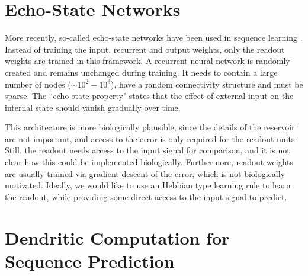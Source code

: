 \documentclass[10pt,a4paper]{article}
\begin{document}
\section{Echo-State Networks}

More recently, so-called echo-state networks have been used in sequence learning \cite{Jaeger_2010}. Instead of training the input, recurrent and output weights, only the readout weights are trained in this framework. A recurrent neural network is randomly created and remains unchanged during training. It needs to contain a large number of nodes ($\sim 10^2 - 10^3$), have a random connectivity structure and must be sparse. The ``echo state property" states that the effect of external input on the internal state should vanish gradually over time.

This architecture is more biologically plausible, since the details of the reservoir are not important, and access to the error is only required for the readout units. Still, the readout needs access to the input signal for comparison, and it is not clear how this could be implemented biologically. Furthermore, readout weights are usually trained via gradient descent of the error, which is not biologically motivated. Ideally, we would like to use an Hebbian type learning rule to learn the readout, while providing some direct access to the input signal to predict.

\section{Dendritic Computation for Sequence Prediction}
\end{document}
